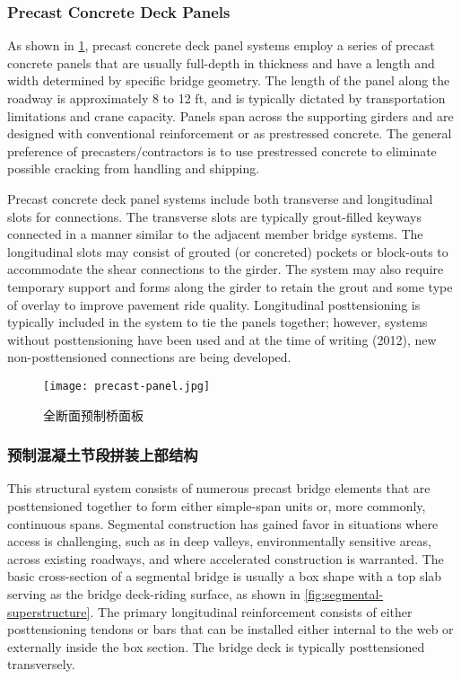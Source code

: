 \subsubsection{Precast Concrete Deck Panels}
As shown in \cref{fig:precast-panel}, precast concrete deck panel systems employ a series of precast concrete panels that are usually full-depth in thickness and have a length and width determined by specific bridge geometry. The length of the panel along the roadway is approximately 8 to 12 ft, and is typically dictated by transportation limitations and crane capacity. Panels span across the supporting girders and are designed with conventional reinforcement or as prestressed concrete. The general preference of precasters/contractors is to use prestressed concrete to eliminate possible cracking from handling and shipping.

Precast concrete deck panel systems include both transverse and longitudinal slots for connections. The transverse slots are typically grout-filled keyways connected in a manner similar to the adjacent member bridge systems. The longitudinal slots may consist of grouted (or concreted) pockets or block-outs to accommodate the shear connections to the girder. The system may also require temporary support and forms along the girder to retain the grout and some type of overlay to improve pavement ride quality. Longitudinal posttensioning is typically included in the system to tie the panels together; however, systems without posttensioning have been used and at the time of writing (2012), new non-posttensioned connections are being developed.

\begin{figure}
  \texttt{[image: precast-panel.jpg]}
  \caption{全断面预制桥面板}
  \label{fig:precast-panel}
\end{figure}

\subsubsection{预制混凝土节段拼装上部结构}
This structural system consists of numerous precast bridge elements that are posttensioned together to form either simple-span units or, more commonly, continuous spans. Segmental construction has gained favor in situations where access is challenging, such as in deep valleys, environmentally sensitive areas, across existing roadways, and where accelerated construction is warranted. The basic cross-section of a segmental bridge is usually a box shape with a top slab serving as the bridge deck-riding surface, as shown in \cref{fig:segmental-superstructure}. The primary longitudinal reinforcement consists of either posttensioning tendons or bars that can be installed either internal to the web or externally inside the box section. The bridge deck is typically posttensioned transversely.

